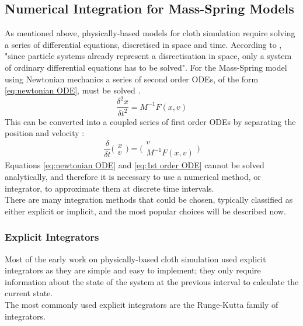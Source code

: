 \subsection{Numerical Integration for Mass-Spring Models}
As mentioned above, physically-based models for cloth simulation require solving a series of differential equations, discretised in space and time. According to \textcite[5]{Wacker2005a}, "since particle systems already represent a disrectisation in space, only a system of ordinary differential equations has to be solved". For the Mass-Spring model using Newtonian mechanics a series of second order ODEs, of the form \ref{eq:newtonian ODE}, must be solved \parencite[5]{Zink2007}.
\begin{equation}
\label{eq:newtonian ODE}
  \frac{\delta^{2}x}{\delta t^{2}} = M^{-1}F(x, v)
\end{equation}
This can be converted into a coupled series of first order ODEs by separating the position and velocity \parencite[5]{Zink2007}:
\begin{equation}
\label{eq:1st order ODE}
  \frac{\delta}{\delta t} \bigg(\begin{array}{c}  x \\ v \end{array}\bigg) = \bigg(\begin{array}{c}  v \\ M^{-1}F(x, v) \end{array}\bigg)
\end{equation}
Equations \ref{eq:newtonian ODE} and \ref{eq:1st order ODE} cannot be solved analytically, and therefore it is necessary to use a numerical method, or integrator, to approximate them at discrete time intervals. 
\\There are many integration methods that could be chosen, typically classified as either explicit or implicit, and the most popular choices will be described now.

\subsubsection{Explicit Integrators}
\label{sec:explicit}
Most of the early work on physically-based cloth simulation used explicit integrators as they are simple and easy to implement; they only require information about the state of the system at the previous interval to calculate the current state.
\\The most commonly used explicit integrators are the Runge-Kutta family of integrators.

